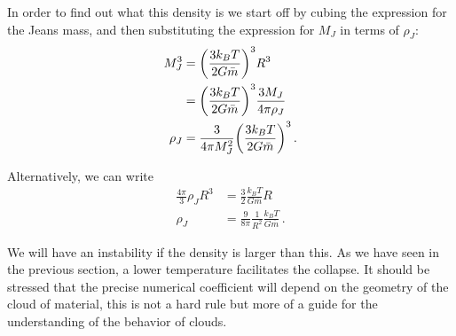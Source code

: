\documentclass[main.tex]{subfiles}
\begin{document}
In order to find out what this density is we start off by cubing the  
expression for the Jeans mass, and then substituting the expression for \(M_J\) in terms of \(\rho _J\):
%
\begin{align}
M_J^3 &= \qty(\frac{3 k_B T}{2 G \bar{m}})^3 R^3\\
&=  \qty(\frac{3 k_B T}{2 G \bar{m}})^3 \frac{3M_J}{4 \pi \rho _J} \\  
  \rho _J &= \frac{3}{4 \pi M_J^2} \qty(\frac{3 k_B T}{2 G \bar{m}})^3
\,.
\end{align}

Alternatively, we can write 
%
\begin{align}
\frac{4 \pi }{3} \rho _J R^3 &= \frac{3}{2} \frac{k_B T}{G \overline{m}} R \\
\rho _J &= \frac{9}{8 \pi } \frac{1}{R^2} \frac{k_B T}{G \overline{m}}
\,. \label{eq:jeans-density}
\end{align}
%


We will have an instability if the density is larger than this.
As we have seen in the previous section, a lower temperature facilitates the collapse. 
It should be stressed that the precise numerical coefficient will depend on the geometry of the cloud of material, this is not a hard rule but more of a guide for the understanding of the behavior of clouds.


\end{document}
